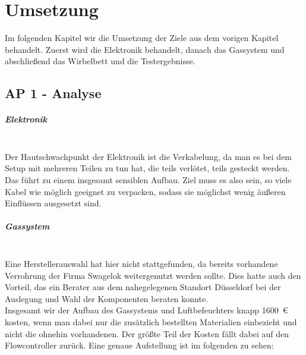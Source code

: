 \chapter{Umsetzung}

Im folgenden Kapitel wir die Umsetzung der Ziele aus dem vorigen Kapitel behandelt. Zuerst wird die Elektronik behandelt, danach das Gassystem und abschließend das Wirbelbett und die Testergebnisse.


\section{AP 1 - Analyse}

\paragraph{Elektronik}
\hfill \\
Der Hautschwachpunkt der Elektronik ist die Verkabelung, da man es bei dem Setup mit mehreren Teilen zu tun hat, die teils verlötet, teils gesteckt werden. Das führt zu einem insgesamt sensiblen Aufbau. Ziel muss es also sein, so viele Kabel wie möglich geeignet zu verpacken, sodass sie möglichst wenig äußeren Einflüssen ausgesetzt sind. 


\paragraph{Gassystem}
\hfill \\
Eine Herstellerauswahl hat hier nicht stattgefunden, da bereits vorhandene Verrohrung der Firma Swagelok weitergenutzt werden sollte. Dies hatte auch den Vorteil, das ein Berater aus dem nahegelegenen Standort Düsseldorf bei der Auslegung und Wahl der Komponenten beraten konnte. \\
Insgesamt wir der Aufbau des Gassystems und Luftbefeuchters knapp \SI{1600}{\euro} kosten, wenn man dabei nur die zusätzlich bestellten Materialien einbezieht und nicht die ohnehin vorhandenen. Der größte Teil der Kosten fällt dabei auf den Flowcontroller zurück. Eine genaue Aufstellung ist im folgenden zu sehen:

